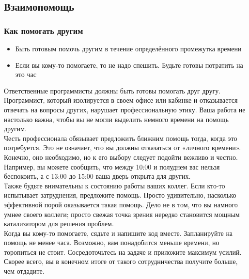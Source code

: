 \documentclass{../industrial-development}
\begin{document}
\subsection{Взаимопомощь}
\begin{frame} \frametitle{Как помогать другим}
\begin{itemize}
  \item Быть готовым помочь другим в течение определённого промежутка времени
  \item Если вы кому-то помогаете, то не надо спешить. Будьте готовы потратить на это час
\end{itemize}
\end{frame}
\lecturenotes
Ответственные программисты должны быть готовы помогать друг другу. Программист, который изолируется в своем офисе или кабинке и отказывается отвечать на вопросы других, нарушает профессиональную этику. Ваша работа не настолько важна, чтобы вы не могли выделить немного времени на помощь другим.\\
Честь профессионала обязывает предложить ближним помощь тогда, когда это потребуется. Это не означает, что вы должны отказаться от «личного времени». Конечно, оно необходимо, но к его выбору следует подойти вежливо и честно. Например, вы можете сообщить, что между 10:00 и полуднем вас нельзя беспокоить, а с 13:00 до 15:00 ваша дверь открыта для других.\\
Также будьте внимательны к состоянию работы ваших коллег. Если кто-то испытывает затруднения, предложите помощь. Просто удивительно, насколько эффективной порой оказывается такая помощь. Дело не в том, что вы намного умнее своего коллеги; просто свежая точка зрения нередко становится мощным катализатором для решения проблем.\\
Когда вы кому-то помогаете, сядьте и напишите код вместе. Запланируйте на помощь не менее часа. Возможно, вам понадобится меньше времени, но торопиться не стоит. Сосредоточьтесь на задаче и приложите максимум усилий. Скорее всего, вы в конечном итоге от такого сотрудничества получите больше, чем отдадите.
\end{document}
